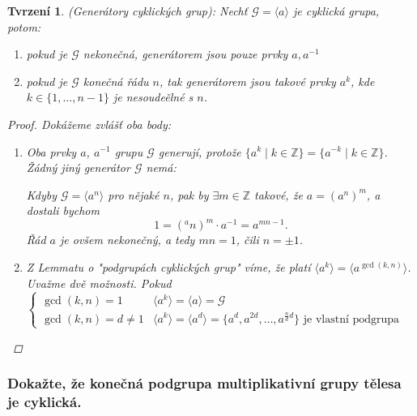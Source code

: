 \documentclass[10pt,a4paper]{article}
\newtheorem{tvrzeni}{Tvrzení}
\newcommand{\Z}{{\mathbb{Z}}}       %
\begin{document}
\begin{tvrzeni} (Generátory cyklických grup): \normalfont
    Nechť $\mathcal{G} = \langle a \rangle$ je cyklická grupa, potom:
    \begin{enumerate}[label=(\arabic*)]
        \item pokud je $\mathcal{G}$ nekonečná, generátorem jsou pouze prvky $a, a^{-1}$
        \item pokud je $\mathcal{G}$ konečná řádu $n$, tak generátorem jsou takové prvky $a^k$, kde $k \in \{1, \dots, n-1\}$ je nesoudeělné s $n$.
    \end{enumerate} 
    \begin{proof} Dokážeme zvlášť oba body:
        \begin{enumerate}[label=(\arabic*)]
            \item Oba prvky $a$, $a^{-1}$ grupu $\mathcal{G}$ generují, protože $\{a^k \mid k \in \Z\} = \{a^{-k} \mid k \in \Z\}$. 
            Žádný jiný generátor $\mathcal{G}$ nemá: 
            
            Kdyby $\mathcal{G} = \langle a^n \rangle$ pro nějaké $n$, 
            pak by $\exists m \in \Z$ takové, že $a = (a^n)^m$, a dostali bychom $$1 = (^an)^m \cdot a^{-1} = a^{mn-1}.$$
            Řád $a$ je ovšem nekonečný, a tedy $mn = 1$, čili $n = \pm1$.
            \item  Z Lemmatu o "podgrupách cyklických grup" víme, že platí $\langle a^k \rangle = \langle a^{\gcd(k,n)}\rangle$. \\
            Uvažme dvě možnosti. Pokud $\begin{cases}
                \gcd(k, n)=1 & \langle a^k\rangle = \langle a\rangle = \mathcal{G}\\
                \gcd(k, n)=d\neq 1 & \langle a^k\rangle = \langle a^d\rangle = \{a^d, a^{2d}, \dots, a^{\frac ndd}\} \text{ je vlastní podgrupa}
            \end{cases}$
        \end{enumerate}        
    \end{proof}
\end{tvrzeni}

\subsubsection{Dokažte, že konečná podgrupa multiplikativní grupy tělesa je cyklická.}
\end{document}
